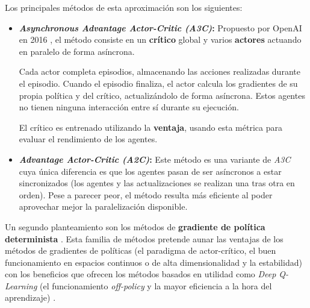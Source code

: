 Los principales métodos de esta aproximación son los siguientes:
\begin{itemize}
	\item \textbf{\textit{Asynchronous Advantage Actor-Critic (A3C)}:} Propuesto por OpenAI en 2016 \cite{DBLP:journals/corr/MnihBMGLHSK16}, el método consiste en un \textbf{crítico} global y varios \textbf{actores} actuando en paralelo de forma asíncrona.
	
	Cada actor completa episodios, almacenando las acciones realizadas durante el episodio. Cuando el episodio finaliza, el actor calcula los gradientes de su propia política y del crítico, actualizándolo de forma asíncrona. Estos agentes no tienen ninguna interacción entre sí durante su ejecución.
	
	El crítico es entrenado utilizando la \textbf{ventaja}, usando esta métrica para evaluar el rendimiento de los agentes.
	
	\item \textbf{\textit{Advantage Actor-Critic (A2C)}:} Este método es una variante de \textit{A3C} \cite{DBLP:journals/corr/MnihBMGLHSK16} cuya única diferencia es que los agentes pasan de ser asíncronos a estar sincronizados (los agentes y las actualizaciones se realizan una tras otra en orden). Pese a parecer peor, el método resulta más eficiente al poder aprovechar mejor la paralelización disponible.
\end{itemize} 

Un segundo planteamiento son los métodos de \textbf{gradiente de política determinista} \cite{vitay_2020}. Esta familia de métodos pretende aunar las ventajas de los métodos de gradientes de políticas (el paradigma de actor-crítico, el buen funcionamiento en espacios continuos o de alta dimensionalidad y la estabilidad) con los beneficios que ofrecen los métodos basados en utilidad como \textit{Deep Q-Learning} (el funcionamiento \textit{off-policy} y la mayor eficiencia a la hora del aprendizaje) \cite{vitay_2020}.

